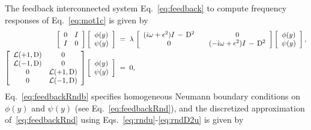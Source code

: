\documentclass[%
secnumarabic,%
 amssymb, amsmath,%
 aps,prf,superscriptaddress,longbibliography
frontmatterverbose,
]{revtex4-2}
\begin{document}
The feedback interconnected system Eq.~\eqref{eq:feedback} to compute frequency responses of Eq.~\eqref{eq:mot1c} is given by
\begin{subequations}\label{eq:feedbackRnd}
\begin{align}
  \left[\begin{array}{cc}
    0 & I\\
    I & 0
  \end{array}\right]\left[\begin{array}{c}
    \phi (y)\\
    \psi (y)
  \end{array}\right]\;&=\;\lambda \,\left[\begin{array}{ccc}
    (i \omega + \epsilon^2) I \,-\, \mathrm D^2 & & 0\\
    0 && (-i \omega + \epsilon^2) I \,-\, \mathrm D^2
  \end{array}\right] \left[\begin{array}{c}
    \phi (y)\\
    \psi (y)
  \end{array}\right],\label{eq:feedbackRnda}\\
  \left[\begin{array}{cc}
    \mathcal{L}(+1,\mathrm D) & 0\\
    \mathcal{L}(-1,\mathrm D)& 0\\
    0 & \mathcal{L}(+1,\mathrm D)\\
    0 & \mathcal{L}(-1,\mathrm D)
  \end{array}\right]\left[\begin{array}{c}
    \phi (y)\\
    \psi (y)
  \end{array}\right] \;&=\; 0, \label{eq:feedbackRndb}
\end{align}
\end{subequations}
Eq.~\eqref{eq:feedbackRndb} specifies homogeneous Neumann boundary conditions on $\phi (y)$ and $\psi (y)$ (see Eq.~\eqref{eq:feedbackRnd}), and the discretized approximation of~\eqref{eq:feedbackRnd} using Eqs.~\eqref{eq:rndu}-\eqref{eq:rndD2u} is given by  
\end{document}
